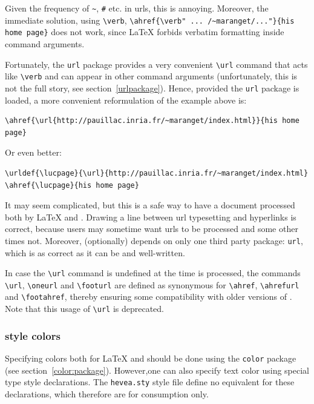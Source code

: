 Given the frequency of \verb+~+, \verb+#+ etc. in urls,
this is annoying. Moreover, the immediate solution, using \verb+\verb+,
\verb+\ahref{\verb" ... /~maranget/..."}{his home page}+
does not work, since \LaTeX{} forbids verbatim formatting
inside command arguments.

Fortunately, the \texttt{url} package provides a very convenient
\verb+\url+ command that acts like \verb+\verb+ and can appear in
other command arguments
(unfortunately, this is not the full story, see section~\ref{urlpackage}).
Hence, provided the \texttt{url} package is loaded,
a more convenient reformulation of the example above is:
\begin{verbatim}
\ahref{\url{http://pauillac.inria.fr/~maranget/index.html}}{his home page}
\end{verbatim}
Or even better:
\begin{verbatim}
\urldef{\lucpage}{\url}{http://pauillac.inria.fr/~maranget/index.html}
\ahref{\lucpage}{his home page}
\end{verbatim}
It may seem complicated, but this is a safe way to have a
document processed both by \LaTeX{} and \hevea{}.
Drawing a line between url typesetting and hyperlinks is correct,
because users may sometime want urls to be processed and some other
times not.
Moreover, \hevea{} (optionally) depends on only one third party package:
\texttt{url}, which is as correct as it can be and well-written.



In case the \verb+\url+ command is undefined
at the time \verb++ is processed, the commands
\verb+\url+, \verb+\oneurl+ and \verb+\footurl+ are defined as
synonymous for
\verb+\ahref+, \verb+\ahrefurl+ and \verb+\footahref+, thereby
ensuring
some compatibility with older versions of \hevea.
Note that this usage of \verb+\url+ is deprecated.

\subsubsection{\html{} style colors}\label{color:high}
Specifying colors both for \LaTeX{} and
\hevea{} should be done using the \texttt{color} package (see
section~\ref{color:package}).
However,one can also specify text color using special type style declarations.
The \texttt{hevea.sty} style file
define no equivalent for these declarations, which therefore are for
\hevea{} consumption only.

